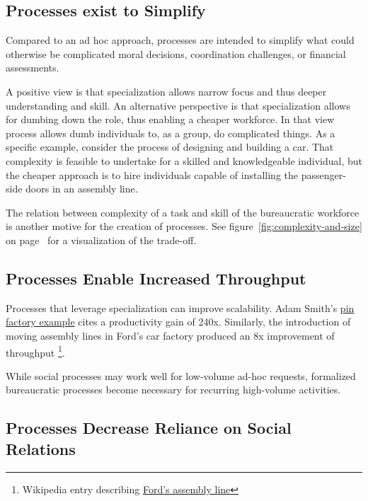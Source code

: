 \subsection*{Processes exist to Simplify}
Compared to an ad hoc approach, processes are intended to simplify what could otherwise be complicated moral decisions, coordination challenges, or financial assessments. %



A positive view is that specialization allows narrow focus and thus deeper understanding and skill. An alternative perspective is that specialization allows for dumbing down the role, thus enabling a cheaper workforce. In that view process allows dumb individuals to, as a group, do complicated things.  As a specific example, consider the process of designing and building a car. That complexity is feasible to undertake for a skilled and knowledgeable individual, but the cheaper approach is to hire individuals capable of installing the passenger-side doors in an assembly line.

The relation between complexity of a task and skill of the bureaucratic workforce is another motive for the creation of processes. See figure~\ref{fig:complexity-and-size} on page~\pageref{fig:complexity-and-size} for a visualization of the trade-off.

\subsection*{Processes Enable Increased Throughput}

Processes that leverage specialization can improve scalability. Adam Smith's \href{https://en.wikipedia.org/wiki/Business_process#Adam_Smith}{pin factory example} cites a productivity gain of 240x. Similarly, the introduction of moving assembly lines in Ford's car factory produced an 8x improvement of throughput \footnote{Wikipedia entry describing \hyperlink{https://en.wikipedia.org/wiki/Assembly_line\%2320th_century}{Ford's assembly line}}. 

While social processes may work well for low-volume ad-hoc requests, formalized bureaucratic processes become necessary for recurring high-volume activities.

\subsection*{Processes Decrease Reliance on Social Relations}

